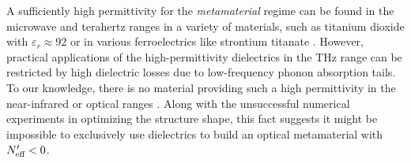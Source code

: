 A sufficiently high permittivity for the \textit{metamaterial} regime can be found in the microwave and terahertz ranges in a variety of materials, such as titanium dioxide with $\varepsilon_r \approx 92$ \cite{nemec2009tunable} or in various ferroelectrics like strontium titanate \cite{skoromets2011tuning}. However, practical applications of the high-permittivity dielectrics in the THz range can be restricted by high dielectric losses due to low-frequency phonon absorption tails. To our knowledge, there is no material providing such a high permittivity in the near-infrared or optical ranges \cite{jelinek2009artificial}. Along with the unsuccessful numerical experiments in optimizing the structure shape, this fact suggests it might be impossible to exclusively use dielectrics to build an optical metamaterial with $N_{\text{eff} }'<0$.

\FloatBarrier %


